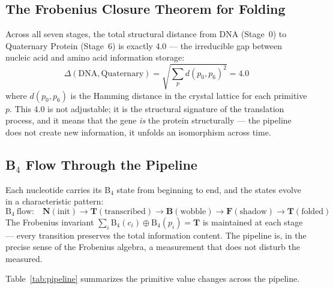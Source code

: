 \documentclass[11pt,a4paper,twocolumn]{article}
\begin{document}
\subsection{The Frobenius Closure Theorem for Folding}

Across all seven stages, the total structural distance from DNA (Stage~0) to Quaternary Protein (Stage~6) is exactly 4.0 — the irreducible gap between nucleic acid and amino acid information storage:
\begin{equation}
\Delta(\text{DNA}, \text{Quaternary}) = \sqrt{\sum_{p} d(p_0, p_6)^2} = 4.0
\end{equation}
where $d(p_0, p_6)$ is the Hamming distance in the crystal lattice for each primitive $p$. This 4.0 is not adjustable; it is the structural signature of the translation process, and it means that the gene \emph{is} the protein structurally — the pipeline does not create new information, it unfolds an isomorphism across time.

\subsection{B$_4$ Flow Through the Pipeline}

Each nucleotide carries its B$_4$ state from beginning to end, and the states evolve in a characteristic pattern:
\begin{equation}
\text{B}_4\ \text{flow:}\quad \mathbf{N}(\text{init}) \to \mathbf{T}(\text{transcribed}) \to \mathbf{B}(\text{wobble}) \to \mathbf{F}(\text{shadow}) \to \mathbf{T}(\text{folded})
\end{equation}
The Frobenius invariant $\sum_i \text{B}_4(c_i) \oplus \text{B}_4(p_i) = \mathbf{T}$ is maintained at each stage — every transition preserves the total information content. The pipeline is, in the precise sense of the Frobenius algebra, a measurement that does not disturb the measured.

Table~\ref{tab:pipeline} summarizes the primitive value changes across the pipeline.
\end{document}
